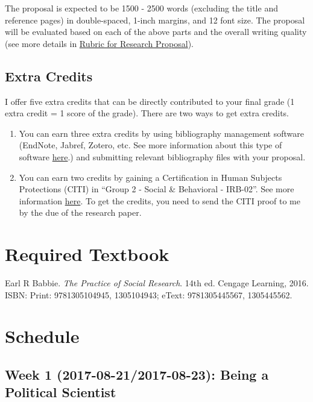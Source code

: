 \documentclass[11pt,]{article}
\theoremstyle{definition}
\theoremstyle{definition}
\theoremstyle{definition}
\theoremstyle{remark}
\begin{document}
The proposal is expected to be 1500 - 2500 words (excluding the title
and reference pages) in double-spaced, 1-inch margins, and 12 font size.
The proposal will be evaluated based on each of the above parts and the
overall writing quality (see more details in
\protect\hyperlink{id}{Rubric for Research Proposal}).

\subsection{Extra Credits}\label{extra-credits}

I offer five extra credits that can be directly contributed to your
final grade (1 extra credit = 1 score of the grade). There are two ways
to get extra credits.

\begin{enumerate}
\def\labelenumi{\arabic{enumi}.}
\item
  You can earn three extra credits by using bibliography management
  software (EndNote, Jabref, Zotero, etc. See more information about
  this type of software
  \href{https://en.wikipedia.org/wiki/Comparison_of_reference_management_software}{here}.)
  and submitting relevant bibliography files with your proposal.
\item
  You can earn two credits by gaining a Certification in Human Subjects
  Protections (CITI) in ``Group 2 - Social \& Behavioral - IRB-02''. See
  more information
  \href{https://hso.research.uiowa.edu/certifications-human-subjects-protections-citi}{here}.
  To get the credits, you need to send the CITI proof to me by the due
  of the research paper.
\end{enumerate}

\section{Required Textbook}\label{required-textbook}

Earl R Babbie. \emph{The Practice of Social Research}. 14th ed. Cengage
Learning, 2016. ISBN: Print: 9781305104945, 1305104943; eText:
9781305445567, 1305445562.

\section{Schedule}\label{schedule}

\subsection{Week 1 (2017-08-21/2017-08-23): Being a Political
Scientist}\label{week-1-2017-08-212017-08-23-being-a-political-scientist}
\end{document}
